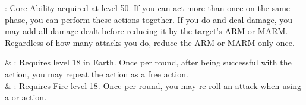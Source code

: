 \begin{ffminipage}
\noindent{}: Core Ability acquired at level 50. If you can act more than once on the same phase, you can perform these actions together. If you do and deal damage, you may add all damage dealt before reducing it by the target’s ARM or MARM. Regardless of how many attacks you do, reduce the ARM or MARM only once. \pc

\begin{jobspec}
 & %
: Requires level 18 in Earth. Once per round, after being successful with the  action, you may repeat the action as a free action. \\
 & %
: Requires Fire level 18. Once per round, you may re-roll an attack when using a  or  action. \\
\end{jobspec}
\end{ffminipage}
